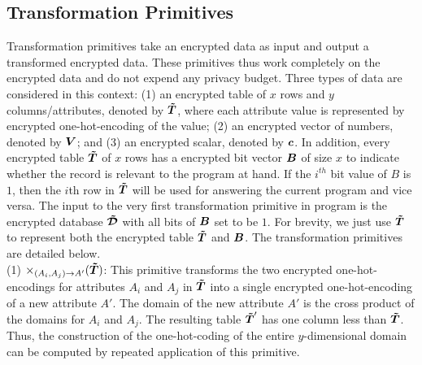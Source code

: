 \subsection{Transformation Primitives}\label{sec:transformation_primitives}
Transformation primitives take an encrypted data as input and output a transformed encrypted data.  These primitives thus work completely on the encrypted data and do not expend any privacy budget. Three types of data are considered in this context: (1) an encrypted table of $x$ rows and $y$ columns/attributes, denoted by $\boldsymbol{\tilde{T}}$, where each attribute value is represented by encrypted one-hot-encoding of the value; (2) an encrypted vector of numbers, denoted by $\boldsymbol{V}$; and (3) an encrypted scalar, denoted by $\boldsymbol{c}$. In addition, every encrypted table $\boldsymbol{\tilde{T}}$ of $x$ rows has a encrypted bit vector $\boldsymbol{B}$ of size $x$ to indicate whether the record is relevant to the program at hand. If the $i^{th}$ bit value of $B$ is $1$, then the $i$th row in $\boldsymbol{\tilde{T}}$ will be used for answering the current program and vice versa. The input to the very first transformation primitive in \system program is the encrypted database $\boldsymbol{\tilde{\mathcal{D}}}$ with all bits of $\boldsymbol{B}$ set to be $1$. For brevity, we just use $\boldsymbol{\tilde{T}}$ to represent both the encrypted table $\boldsymbol{\tilde{T}}$ and $\boldsymbol{B}$. The transformation primitives are detailed below.
\\(1) $\times_{(A_i,A_j)\rightarrow A'}(\boldsymbol{\tilde{T}})$: This primitive transforms the two encrypted one-hot-encodings for attributes $A_i$ and $A_j$ in $\boldsymbol{\tilde{T}}$ into a single encrypted one-hot-encoding of a new attribute $A'$. The domain of the new attribute $A'$ is the cross product of the domains for $A_i$ and $A_j$. The resulting table $\boldsymbol{\tilde{T}}'$ has one column less than $\boldsymbol{\tilde{T}}$. Thus, the construction of the one-hot-coding of the entire $y$-dimensional domain can be computed by repeated application of this primitive. \\	
